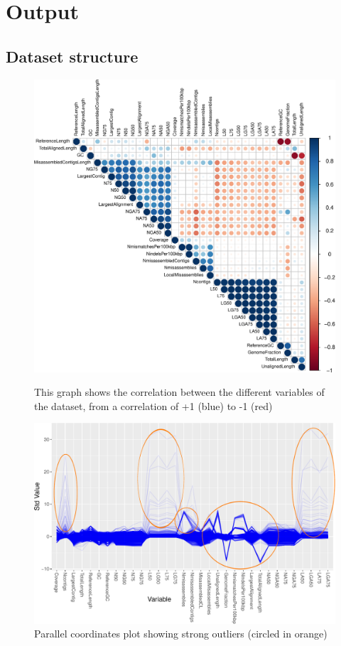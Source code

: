 \documentclass[11pt, a4paper,titlepage]{article}
\begin{document}
\section{Output}
\subsection{Dataset structure}

\begin{figure}[H]
  \centering
  \includegraphics[scale=0.6]{corrplot.pdf}
  \caption{This graph shows the correlation between the different
    variables of the dataset, from a correlation of +1 (blue) to -1
    (red)}
  \label{fig:corrplot}
  \includegraphics[scale=0.6]{parcoord.pdf}
  \caption{Parallel coordinates plot showing strong outliers (circled
    in orange)}
  \label{fig:parcoord}
\end{figure}
\end{document}
